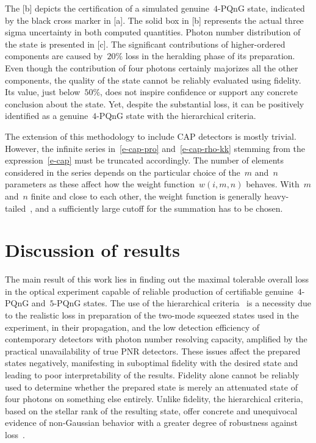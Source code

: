 \documentclass{optica-article}
\begin{document}
The [b] depicts the certification of a simulated genuine~$4$-PQnG state, indicated by the black cross marker in [a]. The solid box in [b] represents the actual three sigma uncertainty in both computed quantities. Photon number distribution of the state is presented in [c]. The significant contributions of higher-ordered components are caused by~$20\%$ loss in the heralding phase of its preparation. Even though the contribution of four photons certainly majorizes all the other components, the quality of the state cannot be reliably evaluated using fidelity. Its value, just below~$50\%$, does not inspire confidence or support any concrete conclusion about the state. Yet, despite the substantial loss, it can be positively identified as a genuine~$4$-PQnG state with the hierarchical criteria. 

The extension of this methodology to include CAP detectors is mostly trivial. However, the infinite series in~\eqref{e-cap-pro} and~\eqref{e-cap-rho-kk} stemming from the expression~\eqref{e-cap} must be truncated accordingly. The number of elements considered in the series depends on the particular choice of the~$m$ and~$n$ parameters as these affect how the weight function~${w(i, m, n)}$ behaves. With~$m$ and~$n$ finite and close to each other, the weight function is generally heavy-tailed~\cite{provaznik2020}, and a sufficiently large cutoff for the summation has to be chosen.

%

\FloatBarrier
\section{Discussion of results}

The main result of this work lies in finding out the maximal tolerable overall loss in the optical experiment capable of reliable production of certifiable genuine~$4$-PQnG and~$5$-PQnG states. The use of the hierarchical criteria~\cite{lachman2019} is a necessity due to the realistic loss in preparation of the two-mode squeezed states used in the experiment, in their propagation, and the low detection efficiency of contemporary detectors with photon number resolving capacity, amplified by the practical unavailability of true PNR detectors. These issues affect the prepared states negatively, manifesting in suboptimal fidelity with the desired state and leading to poor interpretability of the results. Fidelity alone cannot be reliably used to determine whether the prepared state is merely an attenuated state of four photons on something else entirely. Unlike fidelity, the hierarchical criteria, based on the stellar rank of the resulting state, offer concrete and unequivocal evidence of non-Gaussian behavior with a greater degree of robustness against loss~\cite{lachman2019}.
\end{document}
